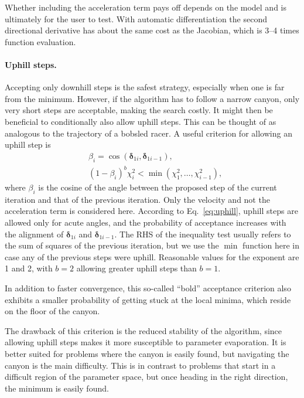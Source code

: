 \documentclass{article}
\begin{document}
Whether including the acceleration term pays off depends on the model and is ultimately for the user to test. With automatic differentiation the second directional derivative has about the same cost as the Jacobian, which is 3--4 times function evaluation.

\paragraph{Uphill steps.} Accepting only downhill steps is the safest strategy, especially when one is far from the minimum. However, if the algorithm has to follow a narrow canyon, only very short steps are acceptable, making the search costly. It might then be beneficial to conditionally also allow uphill steps. This can be thought of as analogous to the trajectory of a bobsled racer. A useful criterion for allowing an uphill step is
\begin{equation}
  \label{eq:uphill}
  \begin{split}
    & \beta_i = \cos(\bm\delta_{1i},\bm\delta_{1i-1}), \\
    & (1-\beta_i)^b\chi_i^2 < \min(\chi_1^2,\ldots,\chi_{i-1}^2),
  \end{split}
\end{equation}
where $\beta_i$ is the cosine of the angle between the proposed step of the current iteration and that of the previous iteration. Only the velocity and not the acceleration term is considered here. According to Eq.~\eqref{eq:uphill}, uphill steps are allowed only for acute angles, and the probability of acceptance increases with the alignment of $\bm\delta_{1i}$ and $\bm\delta_{1i-1}$. The RHS of the inequality test usually refers to the sum of squares of the previous iteration, but we use the $\min$ function here in case any of the previous steps were uphill. Reasonable values for the exponent are 1 and 2, with $b=2$ allowing greater uphill steps than $b=1$.

In addition to faster convergence, this so-called ``bold'' acceptance criterion also exhibits a smaller probability of getting stuck at the local minima, which reside on the floor of the canyon.

The drawback of this criterion is the reduced stability of the algorithm, since allowing uphill steps makes it more susceptible to parameter evaporation. It is better suited for problems where the canyon is easily found, but navigating the canyon is the main difficulty. This is in contrast to problems that start in a difficult region of the parameter space, but once heading in the right direction, the minimum is easily found.
\end{document}
